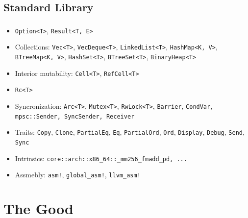\documentclass[aspectratio=43, t]{beamer}
\begin{document}
\subsection*{Standard Library}
\begin{frame}[fragile]
	\frametitle{\subsecname}

	\begin{itemize}
		\item
			\texttt{Option<T>}, 
			\texttt{Result<T, E>}
		\item Collections:
			\texttt{Vec<T>},
			\texttt{VecDeque<T>},
			\texttt{LinkedList<T>},
			\texttt{HashMap<K, V>},
			\texttt{BTreeMap<K, V>},
			\texttt{HashSet<T>},
			\texttt{BTreeSet<T>},
			\texttt{BinaryHeap<T>}
		\item Interior mutability: 
			\texttt{Cell<T>},
			\texttt{RefCell<T>}
		\item
			\texttt{Rc<T>}
		\item Syncronization:
			\texttt{Arc<T>},
			\texttt{Mutex<T>},
			\texttt{RwLock<T>},
			\texttt{Barrier},
			\texttt{CondVar},
			\texttt{mpsc::{Sender, SyncSender, Receiver}}
		\item Traits:
			\texttt{Copy},
			\texttt{Clone},
			\texttt{PartialEq},
			\texttt{Eq},
			\texttt{PartialOrd},
			\texttt{Ord},
			\texttt{Display},
			\texttt{Debug},
			\texttt{Send}, 
			\texttt{Sync} 
		\item Intrinsics:
			\texttt{core::arch::x86_64::{_mm256_fmadd_pd, ...}}
		\item Assmebly:
			\texttt{asm!},
			\texttt{global_asm!},
			\texttt{llvm_asm!}
	\end{itemize}
\end{frame}

\section*{The Good}
\end{document}
